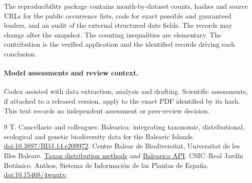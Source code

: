 \documentclass[11pt]{article}
\begin{document}
The reproducibility package contains month-by-dataset counts, hashes and source URLs for the public occurrence lists, code for exact possible and guaranteed leaders, and an audit of the external structured date fields. The records may change after the snapshot. The counting inequalities are elementary. The contribution is the verified application and the identified records driving each conclusion.

\paragraph{Model assessments and review context.} Codex assisted with data extraction, analysis and drafting. Scientific assessments, if attached to a released version, apply to the exact PDF identified by its hash. This text records no independent assessment or peer-review decision.
\begin{thebibliography}{9}
 T. Cancellario and colleagues. Balearica: integrating taxonomic, distributional, ecological and genetic biodiversity data for the Balearic Islands. \href{https://doi.org/10.3897/BDJ.14.e209972}{doi:10.3897/BDJ.14.e209972}.
 Centre Balear de Biodiversitat, Universitat de les Illes Balears. \href{https://balearica.uib.cat/method/getting_started/distribution.html}{Taxon distribution methods} and \href{https://balearica.uib.cat/api/docs}{Balearica API}.
 CSIC--Real Jard\'in Bot\'anico. Anthos, Sistema de Informaci\'on de las Plantas de Espa\~na. \href{https://doi.org/10.15468/4wnutv}{doi:10.15468/4wnutv}.
\end{thebibliography}
\end{document}
